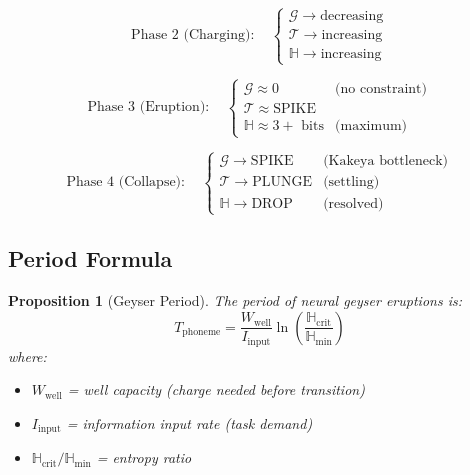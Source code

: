 \documentclass[12pt]{article}
\newtheorem{proposition}{Proposition}
\begin{document}
\begin{equation}
\text{Phase 2 (Charging)}: \quad
\begin{cases}
\mathcal{G} \to \text{decreasing} \\
\mathcal{T} \to \text{increasing} \\
\mathbb{H} \to \text{increasing}
\end{cases}
\end{equation}

\begin{equation}
\text{Phase 3 (Eruption)}: \quad
\begin{cases}
\mathcal{G} \approx 0 & \text{(no constraint)} \\
\mathcal{T} \approx \text{SPIKE} \\
\mathbb{H} \approx 3+ \text{ bits} & \text{(maximum)}
\end{cases}
\end{equation}

\begin{equation}
\text{Phase 4 (Collapse)}: \quad
\begin{cases}
\mathcal{G} \to \text{SPIKE} & \text{(Kakeya bottleneck)} \\
\mathcal{T} \to \text{PLUNGE} & \text{(settling)} \\
\mathbb{H} \to \text{DROP} & \text{(resolved)}
\end{cases}
\end{equation}

\subsection{Period Formula}

\begin{proposition}[Geyser Period]
The period of neural geyser eruptions is:
\begin{equation}
T_{\text{phoneme}} = \frac{W_{\text{well}}}{I_{\text{input}}} \ln\left(\frac{\mathbb{H}_{\text{crit}}}{\mathbb{H}_{\text{min}}}\right)
\end{equation}
where:
\begin{itemize}
\item $W_{\text{well}}$ = well capacity (charge needed before transition)
\item $I_{\text{input}}$ = information input rate (task demand)
\item $\mathbb{H}_{\text{crit}} / \mathbb{H}_{\text{min}}$ = entropy ratio
\end{itemize}
\end{proposition}
\end{document}
